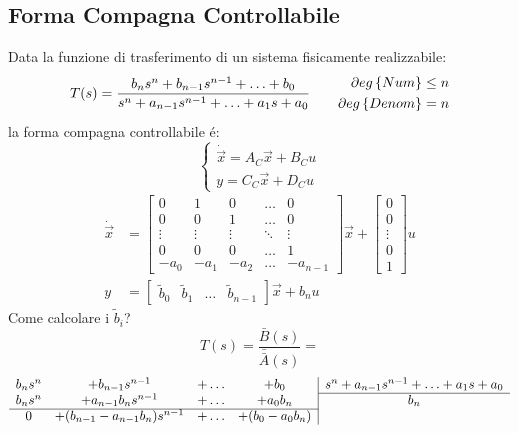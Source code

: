\documentclass[../main.tex]{subfiles}
\begin{document}
	\subsection{Forma Compagna Controllabile}
		Data la funzione di trasferimento di un sistema fisicamente realizzabile:
		\[
			T(s) = \dfrac{b_n s^n + b_{n-1} s^{n-1} + \ldots + b_0}{s^n + a_{n-1} s^{n-1} + \ldots + a_1 s + a_0}
			\qquad
			\begin{aligned}
				\partial eg \left\lbrace Num \right\rbrace \leq n\\
				\partial eg \left\lbrace Denom \right\rbrace = n
			\end{aligned}
		\]
		la forma compagna controllabile \'e:
		\[
			\begin{cases}
				\dot{\vec x} = A_C \vec x + B_C u\\
				y = C_C \vec x + D_C u
			\end{cases}
		\]
		\[
			\begin{aligned}
				\dot{\vec x} &=
				\begin{bmatrix}
					0 & 1 & 0 & \dots & 0\\
					0 & 0 & 1 & \dots & 0\\
					\vdots & \vdots & \vdots & \ddots & \vdots\\
					0 & 0 & 0 & \dots & 1\\
					-a_0 & -a_1 & -a_2 & \dots & -a_{n-1}
				\end{bmatrix} \vec x+
				\begin{bmatrix}
					0\\
					0\\
					\vdots\\
					0\\
					1
				\end{bmatrix} u
				\\
				y &=
				\begin{bmatrix}
					\tilde b_0 & \tilde b_1 & \dots & \tilde b_{n-1}
				\end{bmatrix} \vec x + b_n u
			\end{aligned}
		\]
		Come calcolare i $ \tilde b_i $?
		\[
			T(s) = \dfrac{\bar B(s)}{\bar{\bar A}(s)} =
		\]
		\[
			\begin{array}{cccc|c}
				b_n s^n & +b_{n-1} s^{n-1} & +\dots & +b_0 & s^n + a_{n-1} s^{n-1} + \ldots + a_1 s + a_0
				\\\cline{5-5}
				b_n s^n & +a_{n-1} b_n s^{n-1} & +\dots & +a_0 b_n & b_n
				\\\cline{1-4}
				0 & +(b_{n-1} - a_{n-1} b_n) s^{n-1} & +\dots & +(b_0 - a_0 b_n)
			\end{array}
		\]
\end{document}
